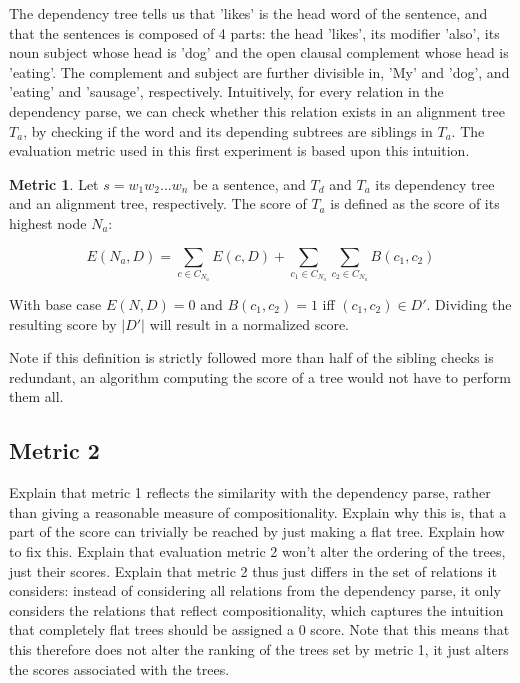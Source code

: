 \documentclass{report}
\theoremstyle{definition}
\newtheorem{metric}{Metric}
\theoremstyle{plain}
\begin{document}
\noindent The dependency tree tells us that 'likes' is the head word of the sentence, and that the sentences is composed of 4 parts: the head 'likes', its modifier 'also', its noun subject whose head is 'dog' and the open clausal complement whose head is 'eating'. The complement and subject are further divisible in, 'My' and 'dog', and 'eating' and 'sausage', respectively. Intuitively, for every relation in the dependency parse, we can check whether this relation exists in an alignment tree $T_a$, by checking if the word and its depending subtrees are siblings in $T_a$. The evaluation metric used in this first experiment is based upon this intuition.

\begin{metric}\label{m1}
Let $s = w_1 w_2 \dots w_n$ be a sentence, and $T_d$ and $T_a$ its dependency tree and an alignment tree, respectively. The score of $T_a$ is defined as the score of its highest node $N_{a}$:

$$
E(N_a,D) = \sum_{c\in C_{N_a}} E(c,D)+ \sum_{c_1\in C_{N_a}} \sum_{c_2\in C_{N_a}} B(c_1,c_2)
$$

\noindent With base case $E(N,D) = 0$ and $B(c_1,c_2) = 1$ iff  $(c_1,c_2)\in D'$. Dividing the resulting score by $|D'|$ will result in a normalized score.
\end{metric}

\noindent  Note if this definition is strictly followed more than half of the sibling checks is redundant, an algorithm computing the score of a tree would not have to perform them all.

\subsection{Metric 2}

Explain that metric 1 reflects the similarity with the dependency parse, rather than giving a reasonable measure of compositionality. Explain why this is, that a part of the score can trivially be reached by just making a flat tree. Explain how to fix this. Explain that evaluation metric 2 won't alter the ordering of the trees, just their scores.
Explain that metric 2 thus just differs in the set of relations it considers: instead of considering all relations from the dependency parse, it only considers the relations that reflect compositionality, which captures the intuition that completely flat trees should be assigned a 0 score. Note that this means that this therefore does not alter the ranking of the trees set by metric 1, it just alters the scores associated with the trees.
\end{document}
